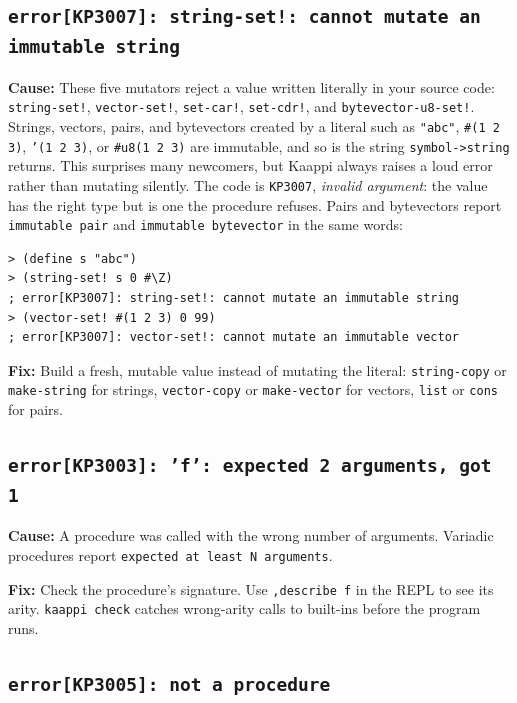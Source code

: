 \subsection{\texttt{error[KP3007]: string-set!: cannot mutate an immutable string}}

\textbf{Cause:} These five mutators reject a value written literally in your source code: \texttt{string-set!}, \texttt{vector-set!}, \texttt{set-car!}, \texttt{set-cdr!}, and \texttt{bytevector-\allowbreak u8-\allowbreak set!}. Strings, vectors, pairs, and bytevectors created by a literal such as \texttt{"abc"}, \texttt{\#(1 2 3)}, \texttt{'(1 2 3)}, or \texttt{\#u8(1 2 3)} are immutable, and so is the string \texttt{symbol->string} returns. This surprises many newcomers, but Kaappi always raises a loud error rather than mutating silently. The code is \texttt{KP3007}, \emph{invalid argument}: the value has the right type but is one the procedure refuses. Pairs and bytevectors report \texttt{immutable pair} and \texttt{immutable bytevector} in the same words:

\begin{lstlisting}[style=repl]
> (define s "abc")
> (string-set! s 0 #\Z)
; error[KP3007]: string-set!: cannot mutate an immutable string
> (vector-set! #(1 2 3) 0 99)
; error[KP3007]: vector-set!: cannot mutate an immutable vector
\end{lstlisting}

\textbf{Fix:} Build a fresh, mutable value instead of mutating the literal: \texttt{string-copy} or \texttt{make-string} for strings, \texttt{vector-copy} or \texttt{make-vector} for vectors, \texttt{list} or \texttt{cons} for pairs.

\subsection{\texttt{error[KP3003]: 'f': expected 2 arguments, got 1}}

\textbf{Cause:} A procedure was called with the wrong number of arguments. Variadic procedures report \texttt{expected at least N arguments}.

\textbf{Fix:} Check the procedure's signature. Use \texttt{,describe f} in the REPL to see its arity. \texttt{kaappi check} catches wrong-arity calls to built-ins before the program runs.

\subsection{\texttt{error[KP3005]: not a procedure}}

